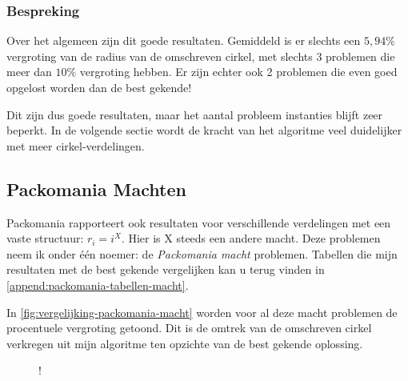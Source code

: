 \documentclass[12pt,a4paper,oneside]{book}
\begin{document}
{\subsubsection{Bespreking}

Over het algemeen zijn dit goede resultaten.
Gemiddeld is er slechts een $5,94\%$ vergroting van de radius van de omschreven cirkel, met slechts 3 problemen die meer dan $10\%$ vergroting hebben.
Er zijn echter ook 2 problemen die even goed opgelost worden dan de best gekende!

Dit zijn dus goede resultaten, maar het aantal probleem instanties blijft zeer beperkt.
In de volgende sectie wordt de kracht van het algoritme veel duidelijker met meer cirkel-verdelingen.

\subsection{Packomania Machten}

Packomania rapporteert ook resultaten voor verschillende verdelingen met een vaste structuur: $r_i=i^X$.
Hier is X steeds een andere macht.
Deze problemen neem ik onder één noemer: de \textit{Packomania macht} problemen.
Tabellen die mijn resultaten met de best gekende vergelijken kan u terug vinden in \autoref{append:packomania-tabellen-macht}.

In \autoref{fig:vergelijking-packomania-macht} worden voor al deze macht problemen de procentuele vergroting getoond.
Dit is de omtrek van de omschreven cirkel verkregen uit mijn algoritme ten opzichte van de best gekende oplossing.

\begin {figure}
	\centering
	 {!} {
		}
\end{figure}}
\end{document}
